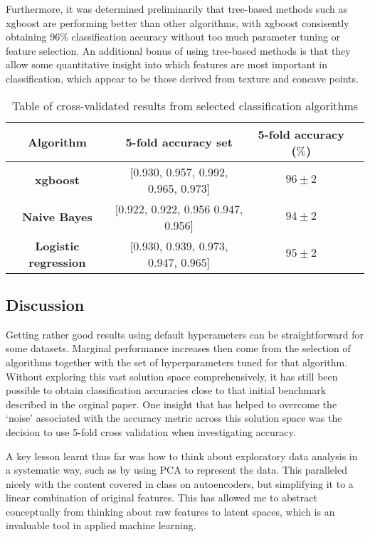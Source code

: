 \documentclass[11pt]{article}
\begin{document}
Furthermore, it was determined preliminarily that tree-based methods such as xgboost are performing better than other algorithms, with xgboost consisently obtaining 96\% classification accuracy without too much parameter tuning or feature selection. An additional bonus of using tree-based methods is that they allow some quantitative insight into which features are most important in classification, which appear to be those derived from texture and concave points.

\begin{table}[h!]
	\centering
	\begin{tabular}{ |c|c|c|c| } 
		\hline
		Algorithm & 5-fold accuracy set & 5-fold accuracy ($\%$) \\
		\hline
		\textbf{xgboost}	& [0.930, 0.957, 0.992, 0.965, 0.973] & $96\pm2$ \\ 
		\textbf{Naive Bayes} & [0.922, 0.922, 0.956 0.947, 0.956] & $94\pm2$ \\ 
		\textbf{Logistic regression} & [0.930, 0.939, 0.973, 0.947, 0.965] & $95\pm2$ \\
		\hline
	\end{tabular}
\caption{Table of cross-validated results from selected classification algorithms}
\label{table:1}
\end{table}


\subsection{Discussion}
Getting rather good results using default hyperameters can be straightforward for some datasets. Marginal performance increases then come from the selection of algorithms together with the set of hyperparameters tuned for that algorithm. Without exploring this vast solution space comprehensively, it has still been possible to obtain classification accuracies close to that initial benchmark described in the orginal paper. One insight that has helped to overcome the `noise' associated with the accuracy metric across this solution space was the decision to use 5-fold cross validation when investigating accuracy.

A key lesson learnt thus far was how to think about exploratory data analysis in a systematic way, such as by using PCA to represent the data. This paralleled nicely with the content covered in class on autoencoders, but simplifying it to a linear combination of original features. This has allowed me to abstract conceptually from thinking about raw features to latent spaces, which is an invaluable tool in applied machine learning. 
\end{document}
